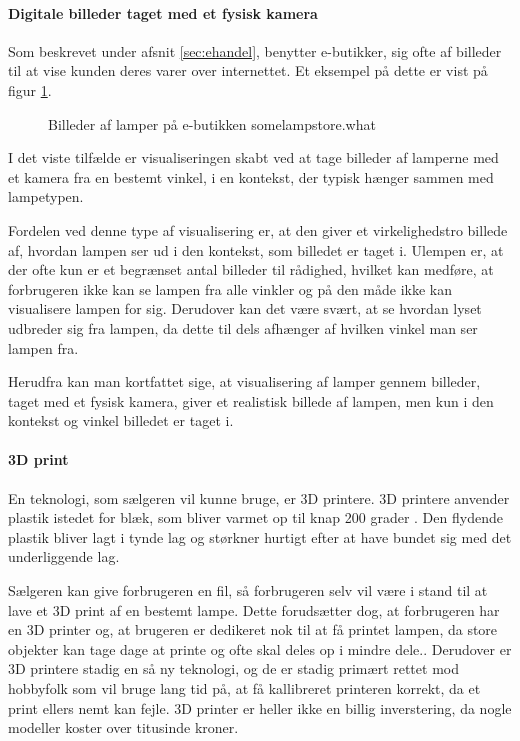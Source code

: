 \paragraph{Digitale billeder taget med et fysisk kamera}
Som beskrevet under afsnit \ref{sec:ehandel}, benytter e-butikker, sig ofte af billeder til at vise kunden deres varer over internettet. Et eksempel på dette er vist på figur \ref{fig:e_handel_lampebilleder}.

\begin{figure}[H]
    \centering
    \fbox{\rule{\textwidth}{5cm}}
    \caption{Billeder af lamper på e-butikken somelampstore.what}
    \label{fig:e_handel_lampebilleder}
\end{figure} 

I det viste tilfælde er visualiseringen skabt ved at tage billeder af lamperne med et kamera fra en bestemt vinkel, i en kontekst, der typisk hænger sammen med lampetypen. 

Fordelen ved denne type af visualisering er, at den giver et virkelighedstro billede af, hvordan lampen ser ud i den kontekst, som billedet er taget i. Ulempen er, at der ofte kun er et begrænset antal billeder til rådighed, hvilket kan medføre, at forbrugeren ikke kan se lampen fra alle vinkler og på den måde ikke kan visualisere lampen for sig. Derudover kan det være svært, at se hvordan lyset udbreder sig fra lampen, da dette til dels afhænger af hvilken vinkel man ser lampen fra. 

Herudfra kan man kortfattet sige, at visualisering af lamper gennem billeder, taget med et fysisk kamera, giver et realistisk billede af lampen, men kun i den kontekst og vinkel billedet er taget i. 

\paragraph{3D print}
En teknologi, som sælgeren vil kunne bruge, er 3D printere. 3D printere anvender plastik istedet for blæk, som bliver varmet op til knap 200 grader \cite{hvordan_3Dprinter}. Den flydende plastik bliver lagt i tynde lag og størkner hurtigt efter at have bundet sig med det underliggende lag. 

Sælgeren kan give forbrugeren en fil, så forbrugeren selv vil være i stand til at lave et 3D print af en bestemt lampe. Dette forudsætter dog, at forbrugeren har en 3D printer og, at brugeren er dedikeret nok til at få printet lampen, da store objekter kan tage dage at printe og ofte skal deles op i mindre dele.\cite{hvordan_3Dprinter}. Derudover er 3D printere stadig en så ny teknologi, og de er stadig primært rettet mod hobbyfolk som vil bruge lang tid på, at få kallibreret printeren korrekt, da et print ellers nemt kan fejle. 3D printer er heller ikke en billig inverstering, da nogle modeller koster over titusinde kroner\cite{3D_printer}. 

